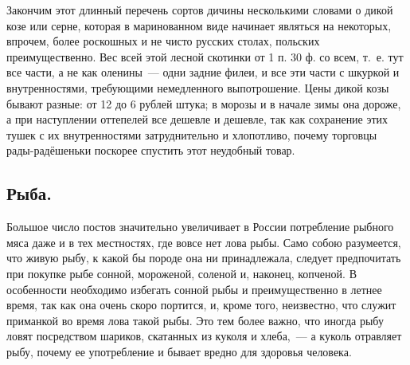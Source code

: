 Закончим этот длинный перечень сортов дичины несколькими словами о дикой козе или серне, которая в маринованном виде начинает являться на некоторых, впрочем, более роскошных и не чисто русских столах, польских преимущественно. Вес всей этой лесной скотинки от 1 п. 30 ф. со всем, т.~е. тут все части, а не как оленины~--- одни задние филеи, и все эти части с шкуркой и внутренностями, требующими немедленного выпотрошение. Цены дикой козы бывают разные: от 12 до 6 рублей штука; в морозы и в начале зимы она дороже, а при наступлении оттепелей все дешевле и дешевле, так как сохранение этих тушек с их внутренностями затруднительно и хлопотливо, почему торговцы рады-радёшеньки поскорее спустить этот неудобный товар.

\subsection{Рыба.}
Большое число постов значительно увеличивает в России потребление рыбного мяса даже и в тех местностях, где вовсе нет лова рыбы. Само собою разумеется, что живую рыбу, к какой бы породе она ни принадлежала, следует предпочитать при покупке рыбе сонной, мороженой, соленой и, наконец, копченой. В особенности необходимо избегать сонной рыбы и преимущественно в летнее время, так как она очень скоро портится, и, кроме того, неизвестно, что служит приманкой во время лова такой рыбы. Это тем более важно, что иногда рыбу ловят посредством шариков, скатанных из куколя и хлеба,~--- а куколь отравляет рыбу, почему ее употребление и бывает вредно для здоровья человека.

